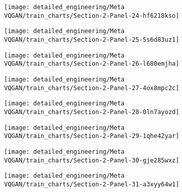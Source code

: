 \begin{figure}[H]
\texttt{[image: detailed\_engineering/Meta VQGAN/train\_charts/Section-2-Panel-24-hf6218kso]}
\caption{}
\endminipage\hfill
{}
\texttt{[image: detailed\_engineering/Meta VQGAN/train\_charts/Section-2-Panel-25-5s6d83uz1]}
\caption{}
\endminipage
\end{figure}

\begin{figure}[H]
\texttt{[image: detailed\_engineering/Meta VQGAN/train\_charts/Section-2-Panel-26-l680emjha]}
\caption{}
\endminipage\hfill
{}
\texttt{[image: detailed\_engineering/Meta VQGAN/train\_charts/Section-2-Panel-27-4ox8mpc2c]}
\caption{}
\endminipage
\end{figure}

\begin{figure}[H]
\texttt{[image: detailed\_engineering/Meta VQGAN/train\_charts/Section-2-Panel-28-0ln7ayozd]}
\caption{}
\endminipage\hfill
{}
\texttt{[image: detailed\_engineering/Meta VQGAN/train\_charts/Section-2-Panel-29-1qhe42yar]}
\caption{}
\endminipage
\end{figure}

\begin{figure}[H]
\texttt{[image: detailed\_engineering/Meta VQGAN/train\_charts/Section-2-Panel-30-gje285wxz]}
\caption{}
\endminipage\hfill
{}
\texttt{[image: detailed\_engineering/Meta VQGAN/train\_charts/Section-2-Panel-31-a3xyy64w1]}
\caption{}
\endminipage
\end{figure}
